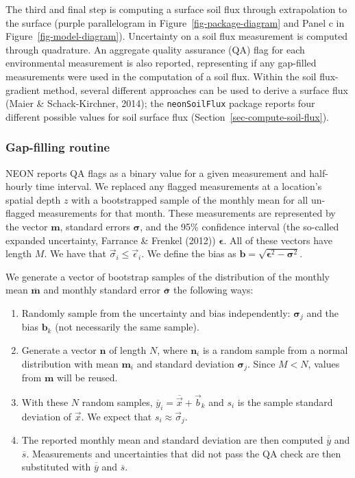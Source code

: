 \documentclass[
  letterpaper,
  DIV=11,
  numbers=noendperiod]{scrartcl}
\providecommand{\tightlist}{%
  \setlength{\itemsep}{0pt}\setlength{\parskip}{0pt}}\usepackage{longtable,booktabs,array}
\begin{document}
The third and final step is computing a surface soil flux through
extrapolation to the surface (purple parallelogram in
Figure~\ref{fig-package-diagram} and Panel c in
Figure~\ref{fig-model-diagram}). Uncertainty on a soil flux measurement
is computed through quadrature. An aggregate quality assurance (QA) flag
for each environmental measurement is also reported, representing if any
gap-filled measurements were used in the computation of a soil flux.
Within the soil flux-gradient method, several different approaches can
be used to derive a surface flux (Maier \& Schack-Kirchner, 2014); the
\texttt{neonSoilFlux} package reports four different possible values for
soil surface flux (Section~\ref{sec-compute-soil-flux}).

\subsubsection{Gap-filling routine}\label{sec-gapfilling}

NEON reports QA flags as a binary value for a given measurement and
half-hourly time interval. We replaced any flagged measurements at a
location's spatial depth \(z\) with a bootstrapped sample of the monthly
mean for all un-flagged measurements for that month. These measurements
are represented by the vector \(\mathbf{m}\), standard errors
\(\boldsymbol\sigma\), and the 95\% confidence interval (the so-called
expanded uncertainty, Farrance \& Frenkel (2012))
\(\boldsymbol\epsilon\). All of these vectors have length \(M\). We have
that \(\vec{\sigma}_{i}\leq\vec{\epsilon}_{i}\). We define the bias as
\(\mathbf{b}=\sqrt{\boldsymbol\epsilon^{2}-\boldsymbol\sigma^{2}}\).

We generate a vector of bootstrap samples of the distribution of the
monthly mean \(\overline{\boldsymbol{m}}\) and monthly standard error
\(\overline{\boldsymbol\sigma}\) the following ways:

\begin{enumerate}
\def\labelenumi{\arabic{enumi}.}
\tightlist
\item
  Randomly sample from the uncertainty and bias independently:
  \(\boldsymbol\sigma_{j}\) and the bias \(\mathbf{b}_{k}\) (not
  necessarily the same sample).
\item
  Generate a vector \(\mathbf{n}\) of length \(N\), where
  \(\mathbf{n}_{i}\) is a random sample from a normal distribution with
  mean \(\boldsymbol{m}_{i}\) and standard deviation
  \(\boldsymbol\sigma_{j}\). Since \(M<N\), values from \(\mathbf{m}\)
  will be reused.
\item
  With these \(N\) random samples,
  \(\overline{y}_{i}=\overline{\vec{x}}+\vec{b}_{k}\) and \(s_{i}\) is
  the sample standard deviation of \(\vec{x}\). We expect that
  \(s_{i} \approx \vec{\sigma}_{j}\).
\item
  The reported monthly mean and standard deviation are then computed
  \(\overline{\overline{y}}\) and \(\overline{s}\). Measurements and
  uncertainties that did not pass the QA check are then substituted with
  \(\overline{\overline{y}}\) and \(\overline{s}\).
\end{enumerate}
\end{document}
